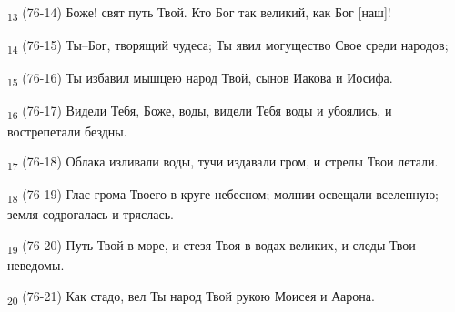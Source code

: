 \begin{tcolorbox}
\textsubscript{13} (76-14) Боже! свят путь Твой. Кто Бог так великий, как Бог [наш]!
\end{tcolorbox}
\begin{tcolorbox}
\textsubscript{14} (76-15) Ты--Бог, творящий чудеса; Ты явил могущество Свое среди народов;
\end{tcolorbox}
\begin{tcolorbox}
\textsubscript{15} (76-16) Ты избавил мышцею народ Твой, сынов Иакова и Иосифа.
\end{tcolorbox}
\begin{tcolorbox}
\textsubscript{16} (76-17) Видели Тебя, Боже, воды, видели Тебя воды и убоялись, и вострепетали бездны.
\end{tcolorbox}
\begin{tcolorbox}
\textsubscript{17} (76-18) Облака изливали воды, тучи издавали гром, и стрелы Твои летали.
\end{tcolorbox}
\begin{tcolorbox}
\textsubscript{18} (76-19) Глас грома Твоего в круге небесном; молнии освещали вселенную; земля содрогалась и тряслась.
\end{tcolorbox}
\begin{tcolorbox}
\textsubscript{19} (76-20) Путь Твой в море, и стезя Твоя в водах великих, и следы Твои неведомы.
\end{tcolorbox}
\begin{tcolorbox}
\textsubscript{20} (76-21) Как стадо, вел Ты народ Твой рукою Моисея и Аарона.
\end{tcolorbox}
